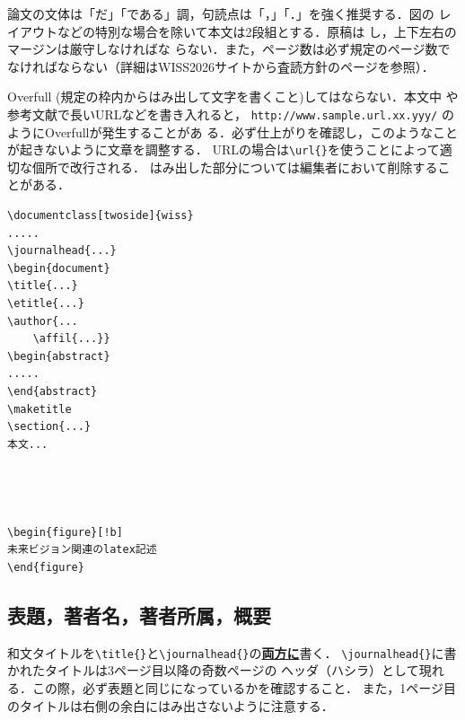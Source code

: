 \documentclass[twoside]{wiss}
\begin{document}
論文の文体は「だ」「である」調，句読点は「，」「．」を強く推奨する．図の
レイアウトなどの特別な場合を除いて本文は2段組とする．原稿は
し，上下左右のマージンは厳守しなければな
らない．また，ページ数は必ず規定のページ数でなければならない（詳細はWISS2026サイトから査読方針のページを参照）．

Overfull (規定の枠内からはみ出して文字を書くこと)してはならない．本文中
や参考文献で長いURLなどを書き入れると，
\verb|http://www.sample.url.xx.yyy/| のようにOverfullが発生することがあ
る．必ず仕上がりを確認し，このようなことが起きないように文章を調整する．
URLの場合は\verb|\url{}|を使うことによって適切な個所で改行される．
はみ出した部分については編集者において削除することがある．

\begin{screen}
\begin{verbatim}
\documentclass[twoside]{wiss}
.....
\journalhead{...}
\begin{document}
\title{...}
\etitle{...}
\author{...
    \affil{...}}
\begin{abstract}
.....
\end{abstract}
\maketitle
\section{...}
本文...




\begin{figure}[!b]
未来ビジョン関連のlatex記述
\end{figure}
\end{verbatim}
\end{screen}



\subsection{表題，著者名，著者所属，概要}

和文タイトルを\verb|\title{}|と\verb|\journalhead{}|の\underline{\textbf{両方に}}書く．
\verb|\journalhead{}|に書かれたタイトルは3ページ目以降の奇数ページの
ヘッダ（ハシラ）として現れる．この際，必ず表題と同じになっているかを確認すること．
また，1ページ目のタイトルは右側の余白にはみ出さないように注意する．
\end{document}
